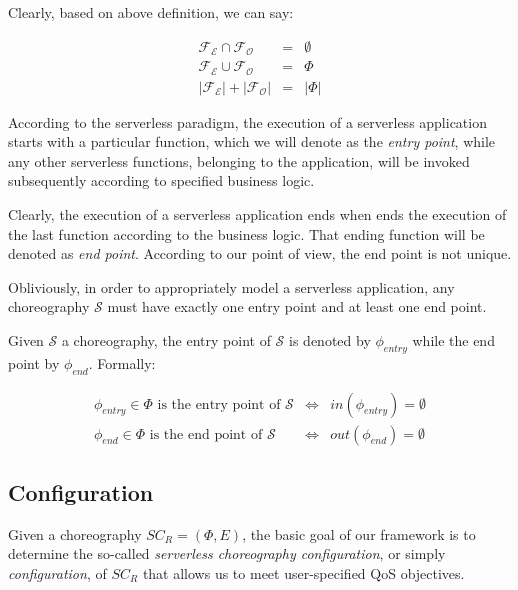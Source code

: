 Clearly, based on above definition, we can say: 

\begin{eqnarray}
\mathscr{F_E} \cap \mathscr{F_O} & = & \emptyset \\
\mathscr{F_E} \cup \mathscr{F_O} & = & \Phi \\
|\mathscr{F_E}| + |\mathscr{F_O}| &=& |\Phi| 
\end{eqnarray}


According to the serverless paradigm, the execution of a serverless application starts with a particular function, which we will denote as the \textit{entry point}, while any other serverless functions, belonging to the application, will be invoked subsequently according to specified business logic. 

Clearly, the execution of a serverless application ends when ends the execution of the last function according to the business logic. That ending function will be denoted as \textit{end point}. According to our point of view, the end point is not unique.

Obliviously, in order to appropriately model a serverless application, any choreography $\mathcal{S}$ must have exactly one entry point and at least one end point. 

Given $\mathcal{S}$ a choreography, the entry point of $\mathcal{S}$ is denoted by $\phi_{entry}$ while the end point by $\phi_{end}$. Formally:

\begin{eqnarray}
	\phi_{entry} \in \Phi \text{ is the entry point of } \mathcal{S} & \Leftrightarrow & in(\phi_{entry}) = \emptyset \\
	\phi_{end} \in \Phi \text{ is the end point of } \mathcal{S} & \Leftrightarrow & out(\phi_{end}) = \emptyset
\end{eqnarray}

\subsection{Configuration}

Given a choreography $SC_R = (\Phi,E)$, the basic goal of our framework is to determine the so-called \textit{serverless choreography configuration}, or simply \textit{configuration}, of $SC_R$ that allows us to meet user-specified QoS objectives.

